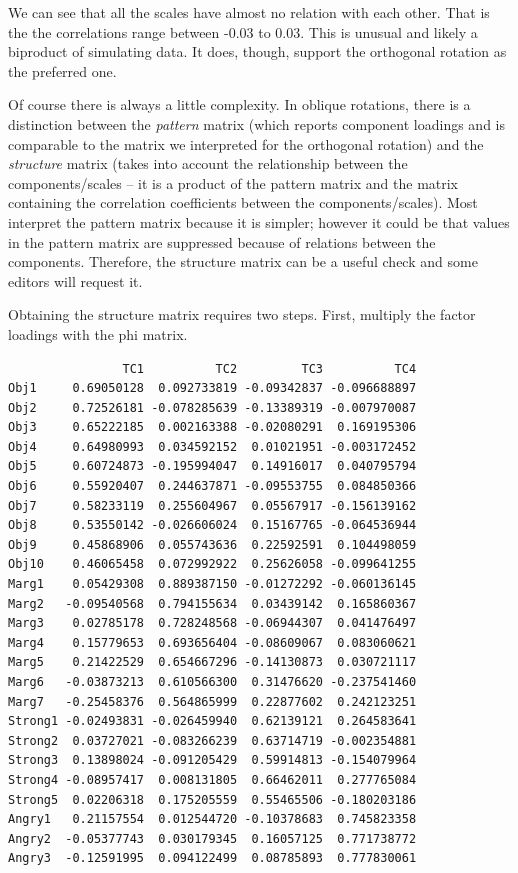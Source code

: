 \documentclass[
  english,
]{book}
\newenvironment{Shaded}{\begin{snugshade}}{\end{snugshade}}
\newcommand{\NormalTok}[1]{#1}
\newcommand{\OperatorTok}[1]{\textcolor[rgb]{0.81,0.36,0.00}{\textbf{#1}}}
\newcommand{\StringTok}[1]{\textcolor[rgb]{0.31,0.60,0.02}{#1}}
\begin{document}
We can see that all the scales have almost no relation with each other. That is the the correlations range between -0.03 to 0.03. This is unusual and likely a biproduct of simulating data. It does, though, support the orthogonal rotation as the preferred one.

Of course there is always a little complexity. In oblique rotations, there is a distinction between the \emph{pattern} matrix (which reports component loadings and is comparable to the matrix we interpreted for the orthogonal rotation) and the \emph{structure} matrix (takes into account the relationship between the components/scales -- it is a product of the pattern matrix and the matrix containing the correlation coefficients between the components/scales). Most interpret the pattern matrix because it is simpler; however it could be that values in the pattern matrix are suppressed because of relations between the components. Therefore, the structure matrix can be a useful check and some editors will request it.

Obtaining the structure matrix requires two steps. First, multiply the factor loadings with the phi matrix.

\begin{Shaded}
\end{Shaded}

\begin{verbatim}
                TC1          TC2         TC3          TC4
Obj1     0.69050128  0.092733819 -0.09342837 -0.096688897
Obj2     0.72526181 -0.078285639 -0.13389319 -0.007970087
Obj3     0.65222185  0.002163388 -0.02080291  0.169195306
Obj4     0.64980993  0.034592152  0.01021951 -0.003172452
Obj5     0.60724873 -0.195994047  0.14916017  0.040795794
Obj6     0.55920407  0.244637871 -0.09553755  0.084850366
Obj7     0.58233119  0.255604967  0.05567917 -0.156139162
Obj8     0.53550142 -0.026606024  0.15167765 -0.064536944
Obj9     0.45868906  0.055743636  0.22592591  0.104498059
Obj10    0.46065458  0.072992922  0.25626058 -0.099641255
Marg1    0.05429308  0.889387150 -0.01272292 -0.060136145
Marg2   -0.09540568  0.794155634  0.03439142  0.165860367
Marg3    0.02785178  0.728248568 -0.06944307  0.041476497
Marg4    0.15779653  0.693656404 -0.08609067  0.083060621
Marg5    0.21422529  0.654667296 -0.14130873  0.030721117
Marg6   -0.03873213  0.610566300  0.31476620 -0.237541460
Marg7   -0.25458376  0.564865999  0.22877602  0.242123251
Strong1 -0.02493831 -0.026459940  0.62139121  0.264583641
Strong2  0.03727021 -0.083266239  0.63714719 -0.002354881
Strong3  0.13898024 -0.091205429  0.59914813 -0.154079964
Strong4 -0.08957417  0.008131805  0.66462011  0.277765084
Strong5  0.02206318  0.175205559  0.55465506 -0.180203186
Angry1   0.21157554  0.012544720 -0.10378683  0.745823358
Angry2  -0.05377743  0.030179345  0.16057125  0.771738772
Angry3  -0.12591995  0.094122499  0.08785893  0.777830061
\end{verbatim}
\end{document}
